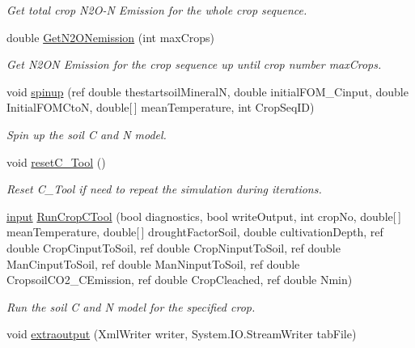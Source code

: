 \begin{DoxyCompactItemize}
\begin{DoxyCompactList}\small\item\em Get total crop N2\+O-\/N Emission for the whole crop sequence. \end{DoxyCompactList}\item 
double \mbox{\hyperlink{class_crop_sequence_class_ae402c0ecf57d9641eaaa030949132b02}{Get\+N2\+O\+Nemission}} (int max\+Crops)
\begin{DoxyCompactList}\small\item\em Get N2\+ON Emission for the crop sequence up until crop number max\+Crops. \end{DoxyCompactList}\item 
void \mbox{\hyperlink{class_crop_sequence_class_ae05480cc30f8329951f9cb63ecb6ced5}{spinup}} (ref double thestartsoil\+MineralN, double initial\+F\+O\+M\+\_\+\+Cinput, double Initial\+F\+O\+M\+CtoN, double\mbox{[}$\,$\mbox{]} mean\+Temperature, int Crop\+Seq\+ID)
\begin{DoxyCompactList}\small\item\em Spin up the soil C and N model. \end{DoxyCompactList}\item 
void \mbox{\hyperlink{class_crop_sequence_class_ad7552e1e3639be6dbd5668e7d458b263}{reset\+C\+\_\+\+Tool}} ()
\begin{DoxyCompactList}\small\item\em Reset C\+\_\+\+Tool if need to repeat the simulation during iterations. \end{DoxyCompactList}\item 
\mbox{\hyperlink{struct_crop_sequence_class_1_1input}{input}} \mbox{\hyperlink{class_crop_sequence_class_ae0df410d4d819c07bcc6f3b4ad00cd8b}{Run\+Crop\+C\+Tool}} (bool diagnostics, bool write\+Output, int crop\+No, double\mbox{[}$\,$\mbox{]} mean\+Temperature, double\mbox{[}$\,$\mbox{]} drought\+Factor\+Soil, double cultivation\+Depth, ref double Crop\+Cinput\+To\+Soil, ref double Crop\+Ninput\+To\+Soil, ref double Man\+Cinput\+To\+Soil, ref double Man\+Ninput\+To\+Soil, ref double Cropsoil\+C\+O2\+\_\+\+C\+Emission, ref double Crop\+Cleached, ref double Nmin)
\begin{DoxyCompactList}\small\item\em Run the soil C and N model for the specified crop. \end{DoxyCompactList}\item 
void \mbox{\hyperlink{class_crop_sequence_class_a280225949ad2e165a2106fed4a681958}{extraoutput}} (Xml\+Writer writer, System.\+I\+O.\+Stream\+Writer tab\+File)

\end{DoxyCompactItemize}
